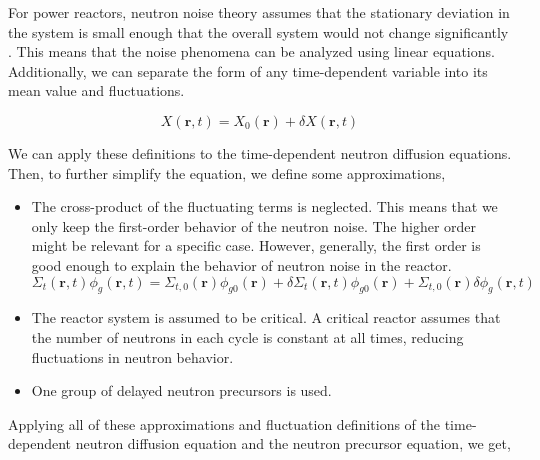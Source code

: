 For power reactors, neutron noise theory assumes that the stationary deviation in the system is small enough that the overall system would not change significantly \cite{pazsitNoiseTechniquesNuclear2010}. This means that the noise phenomena can be analyzed using linear equations. Additionally, we can separate the form of any time-dependent variable into its mean value and fluctuations.

\begin{equation}
        X(\textbf{r}, t) = X_0 (\textbf{r}) + \delta X(\textbf{r}, t)
        \label{eq:fluctuation}
\end{equation}

We can apply these definitions to the time-dependent neutron diffusion equations. Then, to further simplify the equation, we define some approximations,
\begin{itemize}
        \item The cross-product of the fluctuating terms is neglected. This means that we only keep the first-order behavior of the neutron noise. The higher order might be relevant for a specific case. However, generally, the first order is good enough to explain the behavior of neutron noise in the reactor.
        \begin{equation}
                \Sigma_t (\textbf{r}, t) \phi_g (\textbf{r}, t) = \Sigma_{t,0} (\textbf{r}) \phi_{g0} (\textbf{r}) + \delta \Sigma_t (\textbf{r}, t) \phi_{g0} (\textbf{r}) + \Sigma_{t,0} (\textbf{r}) \delta \phi_g (\textbf{r}, t)
        \end{equation}


        \item The reactor system is assumed to be critical. A critical reactor assumes that the number of neutrons in each cycle is constant at all times, reducing fluctuations in neutron behavior. 
	\item One group of delayed neutron precursors is used. 
\end{itemize}

Applying all of these approximations and fluctuation definitions of the time-dependent neutron diffusion equation and the neutron precursor equation, we get,


